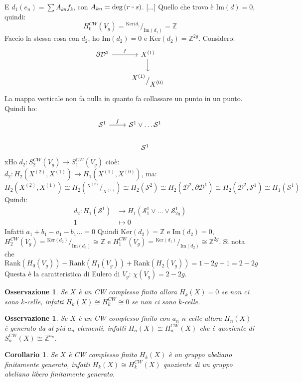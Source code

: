 \documentclass[10pt, twoside=false, x11names]{scrbook}
\newtheorem{osservation}[theorem]{Osservazione}
\newtheorem{corollary}[theorem]{Corollario}
\newcommand{\Z}{\mathbb{Z}}
\newcommand{\im}[1]{\mathrm{Im}( #1 )}
\newcommand{\rank}[1]{\mathrm{Rank}( #1 )}
\renewcommand{\ker}[1]{\mathrm{Ker}( #1)}
\newcommand{\Sph}[1][]{\mathcal{S}^#1}
\newcommand{\Disk}[1][]{\mathcal{D}^#1}
\newcommand*\quot[2]{{^{\textstyle #1}\big/_{\textstyle #2}}}
\let\latexcirc=\circ
\newcommand{\ccirc}{\mathbin{\mathchoice
  {\xcirc\scriptstyle}
  {\xcirc\scriptstyle}
  {\xcirc\scriptscriptstyle}
  {\xcirc\scriptscriptstyle}
}}
\newcommand{\xcirc}[1]{\vcenter{\hbox{$#1\latexcirc$}}}
\let\circ\ccirc
\begin{document}
E $ d_1(e_n) = \sum A_{kn}f_k $, con  $ A_{kn} = \deg {(r \circ s)} $.
[...]
Quello che trovo è $ \im{d} = 0 $, quindi:
\[
  H_0^{CW}(V_g) = \quot{\ker{d_}}{\im{d_1}} = \Z
\]
Faccio la stessa cosa con $ d_2 $, ho $ \im{d_2} = 0 $ e $ \ker{d_2} = \Z^{2g} $.
Considero:
\[
  \begin{tikzcd}
    \partial \Disk{2} \rar{f} & X^{(1)} \dar  \\
    {} & \quot{X^{(1)}}{X^{(0)}}
  \end{tikzcd}
\]
La mappa verticale non fa nulla in quanto fa collassare un punto in un punto.
Quindi ho:
\[
  \begin{tikzcd}
    \Sph{1} \rar{f} & \Sph{1} \vee \dots \Sph{1} \\
    {} & \Sph{1}
  \end{tikzcd}
\]
xHo $ d_2 \colon S^{CW}_2(V_g) \to S_1^{CW}(V_g) $ cioè:
$ d_2 \colon H_2(X^{(2)}, X^{(1)}) \to H_1(X^{(1)}, X^{(0)}) $,
ma:
\[
  H_2(X^{(2)}, X^{(1)}) \cong H_2(\quot{X^{(2)}}{X^{(1)}}) \cong H_2(\Sph{2}) \cong H_2(\Disk{2}, \partial \Disk{1})
  \cong H_2(\Disk{2}, \Sph{1}) \cong H_1(\Sph{1})
\]
Quindi:
\begin{align*}
  d_2 \colon H_1(\Sph{1}) & \to H_1(\Sph{1}_1 \vee \dots \vee \Sph{1}_{2g}) \\
  1 & \mapsto 0
\end{align*}
Infatti $ a_1 + b_1 - a_1 - b_1 \dots = 0$
Quindi $ \ker{d_2} = \Z $ e $ \im{d_2} = 0 $,
$ H_2^{CW}(V_g) = \quot{\ker{d_2}}{\im{d_3}} \cong \Z $ e
$ H_1^{CW}(V_g) = \quot{\ker{d_1}}{\im{d_2}} \cong \Z^{2g} $.
Si nota che
\[
  \rank{H_0(V_g)} - \rank{H_1(V_g)} + \rank{H_2(V_g)} = 1 - 2g + 1 = 2 - 2g
\]
Questa è la caratteristica di Eulero di $ V_g $: $ \chi(V_g) = 2 - 2g $.

\begin{osservation}
  Se $ X $ è un CW complesso finito allora $ H_k(X) = 0 $ se non ci sono $ k $-celle,
  infatti $ H_k(X) \cong H_k^{CW} \cong 0 $ se non ci sono $ k $-celle.
\end{osservation}

\begin{osservation}
  Se $ X $ è un CW complesso finito con $ a_n $ $ n $-celle allora $ H_n(X) $ è
  generato da al più $ a_n $ elementi, infatti $ H_n(X) \cong H_n^{CW}(X) $ che è
  quoziente di $ S_n^{CW}(X) \cong \Z^{a_n} $.
\end{osservation}

\begin{corollary}
  Se $ X $ è CW complesso finito $ H_k(X) $ è un gruppo abeliano finitamente
  generato, infatti $ H_k(X) \cong H_k^{CW}(X) $ quoziente di un gruppo abeliano
  libero finitamente generato.
\end{corollary}
\end{document}

